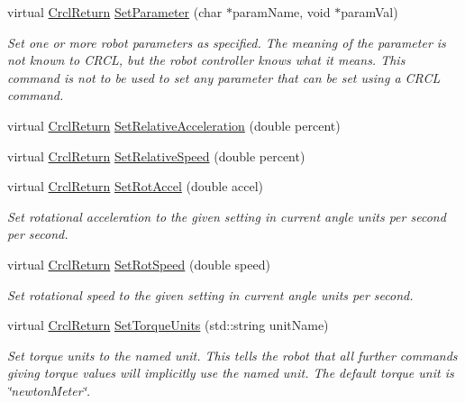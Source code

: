 \begin{DoxyCompactItemize}
virtual \hyperlink{namespaceCrcl_a1ed3b29723118a020251dde9b12733c0}{Crcl\-Return} \hyperlink{classCrcl_1_1CrclDelegateInterface_a961922ae3370ba783a6efd49c60b2615}{Set\-Parameter} (char $\ast$param\-Name, void $\ast$param\-Val)
\begin{DoxyCompactList}\small\item\em Set one or more robot parameters as specified. The meaning of the parameter is not known to C\-R\-C\-L, but the robot controller knows what it means. This command is not to be used to set any parameter that can be set using a C\-R\-C\-L command. \end{DoxyCompactList}\item 
virtual \hyperlink{namespaceCrcl_a1ed3b29723118a020251dde9b12733c0}{Crcl\-Return} \hyperlink{classCrcl_1_1CrclDelegateInterface_a75b341b2b89b4e2c8994f0f8f9090a8c}{Set\-Relative\-Acceleration} (double percent)
\item 
virtual \hyperlink{namespaceCrcl_a1ed3b29723118a020251dde9b12733c0}{Crcl\-Return} \hyperlink{classCrcl_1_1CrclDelegateInterface_ae3862f5c58782fcd5105af10975432d0}{Set\-Relative\-Speed} (double percent)
\item 
virtual \hyperlink{namespaceCrcl_a1ed3b29723118a020251dde9b12733c0}{Crcl\-Return} \hyperlink{classCrcl_1_1CrclDelegateInterface_afc10167b3d7468331c434b60b7f8f737}{Set\-Rot\-Accel} (double accel)
\begin{DoxyCompactList}\small\item\em Set rotational acceleration to the given setting in current angle units per second per second. \end{DoxyCompactList}\item 
virtual \hyperlink{namespaceCrcl_a1ed3b29723118a020251dde9b12733c0}{Crcl\-Return} \hyperlink{classCrcl_1_1CrclDelegateInterface_ab27eaeb82b7b859cf17addcade824829}{Set\-Rot\-Speed} (double speed)
\begin{DoxyCompactList}\small\item\em Set rotational speed to the given setting in current angle units per second. \end{DoxyCompactList}\item 
virtual \hyperlink{namespaceCrcl_a1ed3b29723118a020251dde9b12733c0}{Crcl\-Return} \hyperlink{classCrcl_1_1CrclDelegateInterface_addfaf2d1240dcca39c813c1de09f81a1}{Set\-Torque\-Units} (std\-::string unit\-Name)
\begin{DoxyCompactList}\small\item\em Set torque units to the named unit. This tells the robot that all further commands giving torque values will implicitly use the named unit. The default torque unit is \char`\"{}newton\-Meter\char`\"{}. \end{DoxyCompactList}\item 

\end{DoxyCompactItemize}
